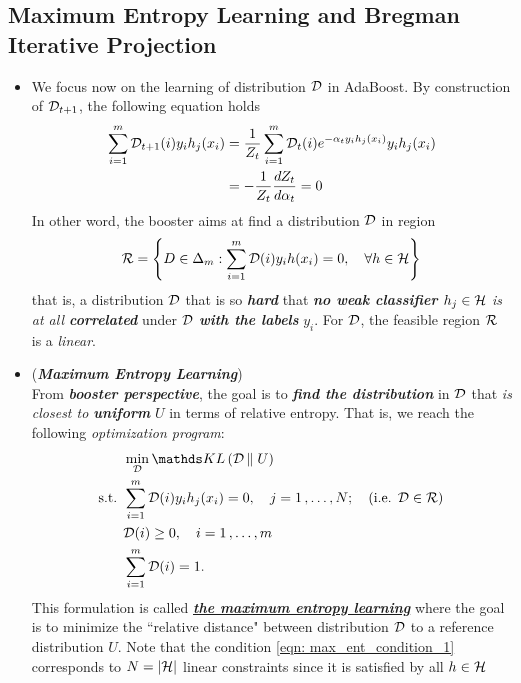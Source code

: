 \documentclass[11pt]{article}
\begin{document}
\subsection{Maximum Entropy Learning and Bregman Iterative Projection}
\begin{itemize}
\item \begin{remark}
We focus now on the learning of distribution ${\mathcal D}$ in AdaBoost. By construction of ${\mathcal D}_{t+1}$, the following equation holds
\begin{align*}
\sum_{i=1}^{m}{\mathcal D}_{t+1}(i)y_i h_j(x_i) &= \frac{1}{Z_t}\sum_{i=1}^{m}{\mathcal D}_{t}(i) e^{-\alpha_t y_i h_j(x_i) } y_i h_j(x_i) \\
&= -  \frac{1}{Z_t} \frac{d Z_t}{d \alpha_t} = 0
\end{align*} In other word, the booster aims at find a distribution ${\mathcal D}$ in region
\begin{align}
{\mathcal R} = \left\{D \in \Delta_{m}: \sum_{i=1}^{m}{\mathcal D}(i)y_i h(x_i) = 0, \quad \forall h \in {\mathcal H}\right\} \label{def: feasible_region_max_ent}
\end{align} that is, a distribution ${\mathcal D}$ that is so \emph{\textbf{hard}} that \emph{\textbf{no weak classifier} $h_j \in {\mathcal H}$ is at all \textbf{correlated}} under ${\mathcal D}$ \emph{\textbf{with the labels}} $y_i$. For ${\mathcal D}$, the feasible region ${\mathcal R}$ is a \emph{linear}.
\end{remark}

\item \begin{remark}(\textbf{\emph{Maximum Entropy Learning}})\\
From \emph{\textbf{booster perspective}}, the goal is to \emph{\textbf{find the distribution}} in ${\mathcal D}$ that \emph{is closest to \textbf{uniform}} $U$ in terms of relative entropy. That is, we reach the following \emph{optimization program}:
\begin{align}
&\min_{\cD} \kl{\cD}{U} \label{eqn: max_ent_boost}\\
\text{s.t. }& \sum_{i=1}^{m}\cD(i)y_i h_j(x_i) = 0, \quad j=1 \xdotx{,} N; \quad (\text{i.e. }\cD \in \cR) \label{eqn: max_ent_condition_1}\\
&\cD(i) \ge 0, \quad i=1 \xdotx{,} m \nonumber\\
&\sum_{i=1}^{m}\cD(i) = 1. \nonumber
\end{align} This formulation is called \underline{\emph{\textbf{the maximum entropy learning}}} where the goal is to minimize the ``relative distance" between distribution ${\mathcal D}$ to a reference distribution $U$. Note that the condition \eqref{eqn: max_ent_condition_1} corresponds to $N = \left\lvert {\mathcal H} \right\rvert$ linear constraints since it is satisfied by all $h \in {\mathcal H}$ 
\end{remark}




\end{itemize}
\end{document}
